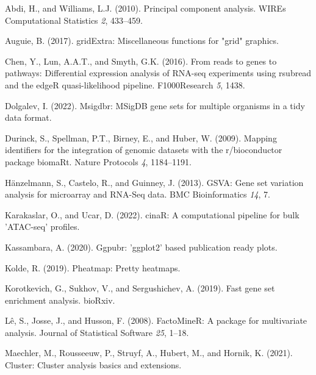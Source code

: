 \documentclass[
]{article}
\newlength{\cslhangindent}
\newlength{\cslentryspacingunit} %
\newenvironment{CSLReferences}[2] %
 {%
  \setlength{\parindent}{0pt}
  \ifodd #1
  \let\oldpar\par
  \def\par{\hangindent=\cslhangindent\oldpar}
  \fi
  \setlength{\parskip}{#2\cslentryspacingunit}
 }%
 {}
\begin{document}
\hypertarget{refs}{}
\begin{CSLReferences}{0}{0}
\leavevmode{}%
Abdi, H., and Williams, L.J. (2010). Principal component analysis. WIREs
Computational Statistics \emph{2}, 433--459.

\leavevmode{}%
Auguie, B. (2017). gridExtra: Miscellaneous functions for "grid"
graphics.

\leavevmode{}%
Chen, Y., Lun, A.A.T., and Smyth, G.K. (2016). From reads to genes to
pathways: Differential expression analysis of RNA-seq experiments using
rsubread and the edgeR quasi-likelihood pipeline. F1000Research
\emph{5}, 1438.

\leavevmode{}%
Dolgalev, I. (2022). Msigdbr: MSigDB gene sets for multiple organisms in
a tidy data format.

\leavevmode{}%
Durinck, S., Spellman, P.T., Birney, E., and Huber, W. (2009). Mapping
identifiers for the integration of genomic datasets with the
r/bioconductor package biomaRt. Nature Protocols \emph{4}, 1184--1191.

\leavevmode{}%
Hänzelmann, S., Castelo, R., and Guinney, J. (2013). {GSVA}: Gene set
variation analysis for microarray and {RNA-Seq} data. BMC Bioinformatics
\emph{14}, 7.

\leavevmode{}%
Karakaslar, O., and Ucar, D. (2022). cinaR: A computational pipeline for
bulk 'ATAC-seq' profiles.

\leavevmode{}%
Kassambara, A. (2020). Ggpubr: 'ggplot2' based publication ready plots.

\leavevmode{}%
Kolde, R. (2019). Pheatmap: Pretty heatmaps.

\leavevmode{}%
Korotkevich, G., Sukhov, V., and Sergushichev, A. (2019). Fast gene set
enrichment analysis. bioRxiv.

\leavevmode{}%
Lê, S., Josse, J., and Husson, F. (2008). {FactoMineR}: A package for
multivariate analysis. Journal of Statistical Software \emph{25}, 1--18.

\leavevmode{}%
Maechler, M., Rousseeuw, P., Struyf, A., Hubert, M., and Hornik, K.
(2021). Cluster: Cluster analysis basics and extensions.


\end{CSLReferences}
\end{document}
